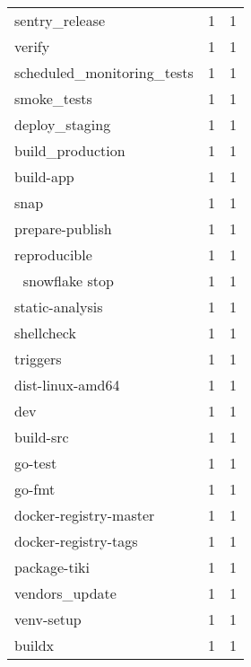 \begin{tabular}{lrr}
sentry\_release             &                   1 &             1 \\
verify                     &                   1 &             1 \\
scheduled\_monitoring\_tests &                   1 &             1 \\
smoke\_tests                &                   1 &             1 \\
deploy\_staging             &                   1 &             1 \\
build\_production           &                   1 &             1 \\
build-app                  &                   1 &             1 \\
snap                       &                   1 &             1 \\
prepare-publish            &                   1 &             1 \\
reproducible               &                   1 &             1 \\
🛑 snowflake stop           &                   1 &             1 \\
static-analysis            &                   1 &             1 \\
shellcheck                 &                   1 &             1 \\
triggers                   &                   1 &             1 \\
dist-linux-amd64           &                   1 &             1 \\
dev                        &                   1 &             1 \\
build-src                  &                   1 &             1 \\
go-test                    &                   1 &             1 \\
go-fmt                     &                   1 &             1 \\
docker-registry-master     &                   1 &             1 \\
docker-registry-tags       &                   1 &             1 \\
package-tiki               &                   1 &             1 \\
vendors\_update             &                   1 &             1 \\
venv-setup                 &                   1 &             1 \\
buildx                     &                   1 &             1 \\

\end{tabular}
